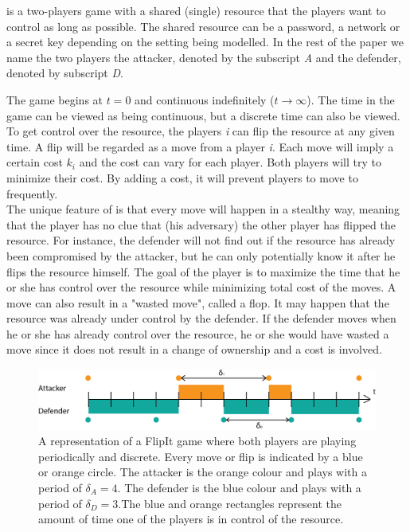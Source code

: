  is a two-players game with a shared (single) resource that the players want to control as long as possible. The shared resource can be a password, a network or a secret key depending on the setting being modelled. In the rest of the paper we name the two players the attacker, denoted by the subscript \textit{A} and the defender, denoted by subscript \textit{D}. 

The game begins at $t=0$ and continuous indefinitely ($t \rightarrow \infty $). The time in the game can be viewed as being continuous, but a discrete time can also be viewed. To get control over the resource, the players \textit{i} can flip the resource at any given time. A flip will be regarded as a move from a player \textit{i}. Each move will imply a certain cost $k_{i}$ and the cost can vary for each player. Both players will try to minimize their cost. By adding a cost, it will prevent players to move to frequently. \\

The unique feature of  is that every move will happen in a stealthy way, meaning that the player has no clue that (his adversary) the other player has flipped the resource. For instance, the defender will not find out if the resource has already been compromised by the attacker, but he can only potentially know it after he flips the resource himself. The goal of the player is to maximize the time that he or she has control over the resource while minimizing total cost of the moves. A move can also result in a "wasted move", called a flop. It may happen that the resource was already under control by the defender. If the defender moves when he or she has already control over the resource, he or she would have wasted a move since it does not result in a change of ownership and a cost is involved. \\


\begin{figure}[hbtp]
\centering
\includegraphics[scale=0.8]{Images/DefFlipit}
\caption{A representation of a FlipIt game where both players are playing periodically and discrete. Every move or flip is indicated by a blue or orange circle. The attacker is the orange colour and plays with a period of $\delta_{A}=4$. The defender is the blue colour and plays with a period of $\delta_{D}=3$.The blue and orange rectangles represent the amount of time one of the players is in control of the resource.}
\label{fig:FLipItDefault}
\end{figure}


